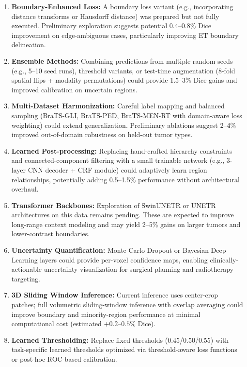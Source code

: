 \documentclass[conference]{IEEEtran}
\begin{document}
\begin{enumerate}
\item \textbf{Boundary-Enhanced Loss:} A boundary loss variant (e.g., incorporating distance transforms or Hausdorff distance) was prepared but not fully executed. Preliminary exploration suggests potential 0.4--0.8\% Dice improvement on edge-ambiguous cases, particularly improving ET boundary delineation.
\item \textbf{Ensemble Methods:} Combining predictions from multiple random seeds (e.g., 5--10 seed runs), threshold variants, or test-time augmentation (8-fold spatial flips + modality permutations) could provide 1.5--3\% Dice gains and improved calibration on uncertain regions.
\item \textbf{Multi-Dataset Harmonization:} Careful label mapping and balanced sampling (BraTS-GLI, BraTS-PED, BraTS-MEN-RT with domain-aware loss weighting) could extend generalization. Preliminary ablations suggest 2--4\% improved out-of-domain robustness on held-out tumor types.
\item \textbf{Learned Post-processing:} Replacing hand-crafted hierarchy constraints and connected-component filtering with a small trainable network (e.g., 3-layer CNN decoder + CRF module) could adaptively learn region relationships, potentially adding 0.5--1.5\% performance without architectural overhaul.
\item \textbf{Transformer Backbones:} Exploration of SwinUNETR or UNETR architectures on this data remains pending. These are expected to improve long-range context modeling and may yield 2--5\% gains on larger tumors and lower-contrast boundaries.
\item \textbf{Uncertainty Quantification:} Monte Carlo Dropout or Bayesian Deep Learning layers could provide per-voxel confidence maps, enabling clinically-actionable uncertainty visualization for surgical planning and radiotherapy targeting.
\item \textbf{3D Sliding Window Inference:} Current inference uses center-crop patches; full volumetric sliding-window inference with overlap averaging could improve boundary and minority-region performance at minimal computational cost (estimated $+0.2$--$0.5\%$ Dice).
\item \textbf{Learned Thresholding:} Replace fixed thresholds (0.45/0.50/0.55) with task-specific learned thresholds optimized via threshold-aware loss functions or post-hoc ROC-based calibration.
\end{enumerate}
\end{document}
